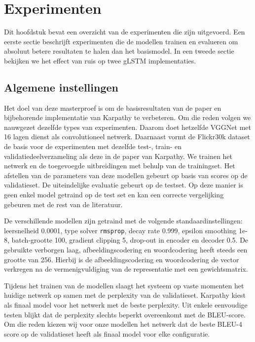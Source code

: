 \chapter{Experimenten} %
\label{cha:experimenten}
Dit hoofdstuk bevat een overzicht van de experimenten die zijn uitgevoerd. Een eerste sectie beschrijft experimenten die de modellen trainen en evalueren om absoluut betere resultaten te halen dan het basismodel. In een tweede sectie bekijken we het effect van ruis op twee gLSTM implementaties.

\section{Algemene instellingen} %
\label{sec:eigen_implementaties_exp}
Het doel van deze masterproef is om de basisresultaten van de paper en bijbehorende implementatie van Karpathy\cite{Karpathy2015} te verbeteren. Om die reden volgen we nauwgezet dezelfde types van experimenten. Daarom doet hetzelfde VGGNet met 16 lagen dienst als convolutioneel netwerk. Daarnaast vormt de  Flickr30k dataset de basis voor de experimenten met dezelfde test-, train- en validatiedeelverzameling als deze in de paper van Karpathy. We trainen het netwerk en de toegevoegde uitbreidingen met behulp van de trainingset. Het afstellen van de parameters van deze modellen gebeurt op basis van scores op de validatieset. De uiteindelijke evaluatie gebeurt op de testset. Op deze manier is geen enkel model getraind op de test set en kan een correcte vergelijking gebeuren met de rest van de literatuur.

De verschillende modellen zijn getraind met de volgende standaardinstellingen: leersnelheid 0.0001, type solver \texttt{rmsprop}, decay rate 0.999, epsilon smoothing 1e-8, batch-grootte 100, gradient clipping 5, drop-out in encoder en decoder 0.5.
De gebruikte verborgen laag, afbeeldingscodering en woordcodering heeft steeds een grootte van 256. Hierbij is de afbeeldingscodering en woordcodering de vector verkregen na de vermenigvuldiging van de representatie met een gewichtsmatrix.

Tijdens het trainen van de modellen slaagt het systeem op vaste momenten het huidige netwerk op samen met de perplexity van de validatieset. Karpathy kiest als finaal model voor het netwerk met de beste perplexity. Uit enkele eenvoudige testen blijkt dat de perplexity slechts beperkt overeenkomt met de BLEU-score. Om die reden kiezen wij voor onze modellen het netwerk dat de beste BLEU-4 score op de validatieset heeft als finaal model voor elke configuratie.

